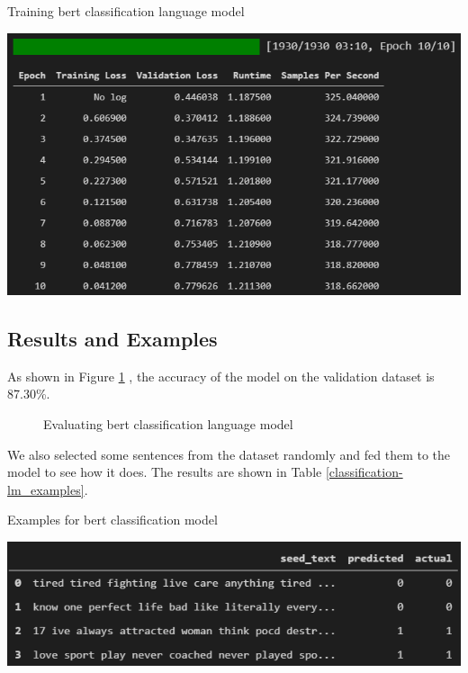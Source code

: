 \documentclass[12pt, a4paper]{article}
\begin{document}
	\begin{table}[H]
		\caption{Training bert classification language model}
		\centering
		\vspace{5mm} 
		\includegraphics[width=\linewidth, height=\textheight, keepaspectratio]{../reports/images/classification-lm_train.png}
		\label{classification-lm_train}
	\end{table}
	
	
	\subsection{Results and Examples}
	As shown in Figure \ref{classification-lm_eval} , the accuracy of the model on the validation dataset is 87.30\%.
	
	\begin{figure}[H]
		\caption{Evaluating bert classification language model}
		\label{classification-lm_eval}
	\end{figure}
	
	We also selected some sentences from the dataset randomly and fed them to the model to see how it does. The results are shown in Table \ref{classification-lm_examples}.
	
	\begin{table}[H]
		\caption{Examples for bert classification model}
		\centering
		\includegraphics[width=\linewidth, height=\textheight, keepaspectratio]{../reports/images/classification-lm_examples.png}
		\label{classification-lm_examples}
	\end{table}
	
\end{document}
